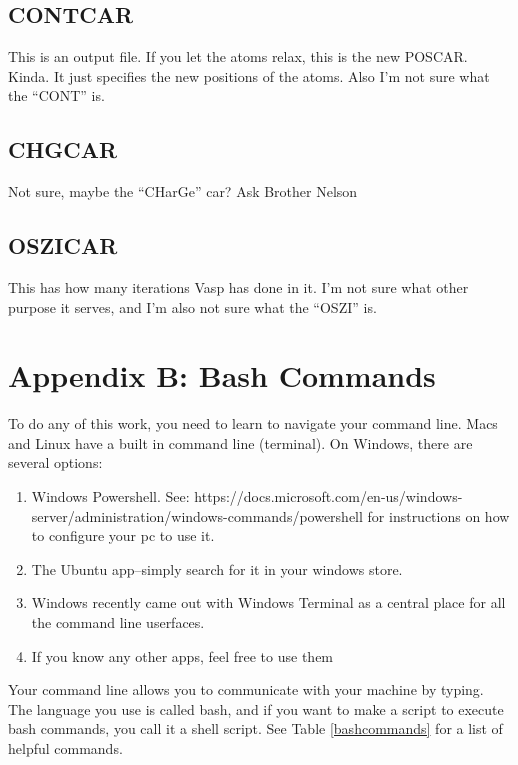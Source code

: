 \documentclass{article}
\begin{document}
\subsection*{CONTCAR}
This is an output file. If you let the atoms relax, this is the new POSCAR. Kinda. It just
specifies the new positions of the atoms. Also I'm not sure what the
``CONT'' is. 

\subsection*{CHGCAR}
Not sure, maybe the ``CHarGe'' car? Ask Brother Nelson

\subsection*{OSZICAR}
This has how many iterations Vasp has done in it. I'm not sure what
other purpose it serves, and I'm also not sure what the ``OSZI'' is. 


\section*{Appendix B: Bash Commands} \label{sec:bash}

To do any of this work, you need to learn to navigate your command
line. Macs and Linux have a built in command line (terminal). On
Windows, there are several options:
\begin{enumerate}
  \item{Windows Powershell. See:
      https://docs.microsoft.com/en-us/windows-
      server/administration/windows-commands/powershell
      for instructions on how to configure your pc to use it.}
  \item{The Ubuntu app--simply search for it in your windows store.}
  \item{Windows recently came out with Windows Terminal as a 
      central place for all the command line userfaces.}
  \item{If you know any other apps, feel free to use them}
\end{enumerate}
Your command line allows you to communicate with your machine by
typing. The language you use is called bash, and if you want to make a
script to execute bash commands, you call it a shell script. See Table
\ref{bashcommands} for a list of helpful commands.  
\end{document}

